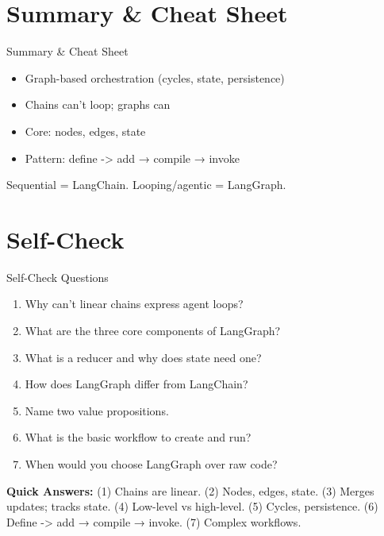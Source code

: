 \documentclass[aspectratio=169,11pt]{beamer}
\begin{document}
\section{Summary \& Cheat Sheet}
\begin{frame}[t,shrink=4]{Summary \& Cheat Sheet}
\setlength{\itemsep}{0.5pt}
\vspace{0.05cm}

{\footnotesize
\begin{conceptbox}
\setlength{\itemsep}{0.5pt}
\begin{itemize}
  \item Graph-based orchestration (cycles, state, persistence)
  \item Chains can't loop; graphs can
  \item Core: nodes, edges, state
  \item Pattern: define -> add → compile → invoke
\end{itemize}
\end{conceptbox}

Sequential = LangChain. Looping/agentic = LangGraph.
}
\end{frame}

\section{Self-Check}
\begin{frame}[t,shrink=3]{Self-Check Questions}
\setlength{\itemsep}{0pt}
\vspace{0.05cm}

{\footnotesize
\begin{enumerate}
\setlength{\itemsep}{0.5pt}
  \item Why can't linear chains express agent loops?
  \item What are the three core components of LangGraph?
  \item What is a reducer and why does state need one?
  \item How does LangGraph differ from LangChain?
  \item Name two value propositions.
  \item What is the basic workflow to create and run?
  \item When would you choose LangGraph over raw code?
\end{enumerate}

\vspace{0.05cm}

\textbf{Quick Answers:} (1) Chains are linear. (2) Nodes, edges, state. (3) Merges updates; tracks state. (4) Low-level vs high-level. (5) Cycles, persistence. (6) Define -> add → compile → invoke. (7) Complex workflows.
}
\end{frame}
\end{document}
